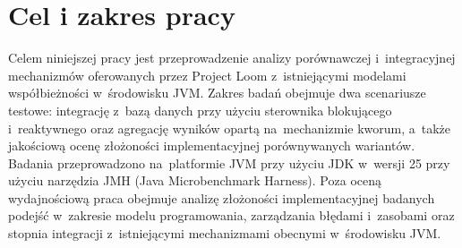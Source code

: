 \section{Cel i zakres pracy}

Celem niniejszej pracy jest przeprowadzenie analizy porównawczej i~integracyjnej mechanizmów oferowanych przez Project Loom z~istniejącymi modelami współbieżności w~środowisku JVM. Zakres badań obejmuje dwa scenariusze testowe: integrację z~bazą danych przy użyciu sterownika blokującego i~reaktywnego oraz agregację wyników opartą na~mechanizmie kworum, a~także jakościową ocenę złożoności implementacyjnej porównywanych wariantów.
Badania przeprowadzono na~platformie JVM przy użyciu JDK w~wersji 25 przy użyciu narzędzia JMH (Java Microbenchmark Harness). Poza oceną wydajnościową praca obejmuje analizę złożoności implementacyjnej badanych podejść w~zakresie modelu programowania, zarządzania błędami i~zasobami oraz stopnia integracji z~istniejącymi mechanizmami obecnymi w~środowisku JVM.








